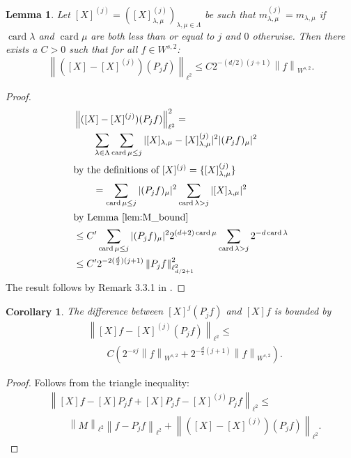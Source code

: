 \documentclass[12pt]{amsart}
\newcommand{\norm}[1]{\ensuremath{\left\| #1 \right\| }}
\newcommand{\abs}[1]{\ensuremath{ | #1 | }}
\newtheorem{cor}[thm]{Corollary}
\newtheorem{lem}[thm]{Lemma}
\DeclareMathOperator{\card}{card}
\begin{document}
\begin{lem} 
	Let $[X]^{(j)}=([X]^{(j)}_{\lambda,\mu})_{\lambda,\mu \in \Lambda}$ be such that $m^{(j)}_{\lambda,\mu} = m_{\lambda,\mu}$ if $\card{\lambda}$ and $\card{\mu}$ are both less than or equal to $j$ and $0$ otherwise. Then there exists a $C > 0$ such that for all $f \in W^{s,2}$:
	\begin{equation}
		\norm{( [X]- [X]^{(j)})(P_j f)}_{\ell^2} \leq C2^{-(d/2)(j+1)} \norm{f}_{W^{s,2}}.
	\end{equation}
\end{lem}
\begin{proof}
	\begin{align*}
		&\norm{([X]-[X]^{(j)})(P_j f)}_{\ell^2}^2 = \\
		&\qquad \sum_{\lambda \in \Lambda} \sum_{\card{\mu}\leq j} \abs{[X]_{\lambda,\mu}-[X]^{(j)}_{\lambda,\mu}}^2 \abs{(P_j f)_\mu}^2 \\
	\intertext{by the definitions of $[X]^{(j)} = \{ [X]_{\lambda,\mu}^{(j)} \}$ }
		&\qquad = \sum_{\card{\mu}\leq j}\abs{(P_j f)_\mu}^2 \sum_{\card{\lambda}>j}\abs{[X]_{\lambda,\mu}}^2 \\
	\intertext{by Lemma \ref{lem:M_bound}}
		 &\leq C'\sum_{\card{\mu}\leq j}\abs{(P_j f)_\mu}^2 2^{(d+2)\card{\mu}}\sum_{\card{\lambda}>j}2^{-d\card{\lambda}} \\
		 &\leq C' 2^{-2(\frac{d}{2})(j+1)}\norm{P_j f}^2_{\ell^2_{d/2+1}}
	\end{align*}
	The result follows by Remark 3.3.1 in \cite{Cohen2003}.
\end{proof}

\begin{cor}
	The difference between $[X]^j (P_j f)$ and $[X] f$ is bounded by
	\begin{align*}
		&\norm{[X]f - [X]^{(j)}(P_j f)}_{\ell^2} \leq \\
		&	\qquad  C \left( 2^{-sj}\norm{f}_{W^{s,2}} + 2^{-\frac{d}{2}(j+1)}\norm{f}_{W^{s,2}} \right).
	\end{align*}
\end{cor}
\begin{proof}
	Follows from the triangle inequality:
	\begin{align*}
		&\norm{[X]f - [X] P_j f + [X] P_j f - [X]^{(j)} P_j f}_{\ell^2} \leq \\
		&\qquad \norm{M}_{\ell^2} \norm{f - P_j f}_{\ell^2} + \norm{([X]-[X]^{(j)})(P_j f)}_{\ell^2}.
	\end{align*}
\end{proof}
\end{document}
